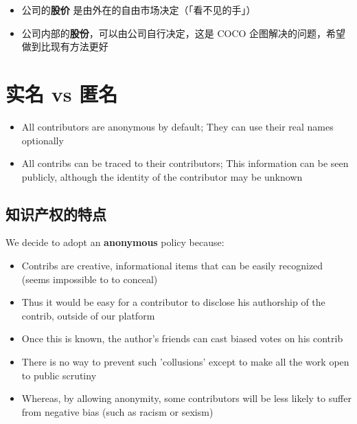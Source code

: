 \documentclass[12pt, orivec]{article}
\newcommand{\cc}[2]{#1}
\newcommand{\cc}[2]{#2}
\begin{document}
\begin{itemize}
	\item \cc{公司的\textbf{股价} 是由外在的自由市场决定（「看不见的手」）}
	{A company's \textbf{stock prices} are determined externally by the free-market (``invisible hand'')}

	\item \cc{公司内部的\textbf{股份}，可以由公司自行决定，这是 COCO 企图解决的问题，希望做到比现有方法更好}
	{How the company distributes its \textbf{shares} are decided internally;  This is where COCO tries to innovate}
\end{itemize}

\secttoc
\section{\cc{实名 vs 匿名}{Real-name vs anonymous}}

\begin{itemize}
	\item All contributors are anonymous by default;  They can use their real names optionally
	
	\item All contribs can be traced to their contributors;  This information can be seen publicly, although the identity of the contributor may be unknown
\end{itemize}

\secttoc
\subsection{\cc{知识产权的特点}{Uniqueness of intellectual properties}}

We decide to adopt an \textbf{anonymous} policy because:
\begin{itemize}
	\item Contribs are creative, informational items that can be easily recognized (seems impossible to to conceal)
	\item Thus it would be easy for a contributor to disclose his authorship of the contrib, outside of our platform
	\item Once this is known, the author's friends can cast biased votes on his contrib
	\item There is no way to prevent such 'collusions' except to make all the work open to public scrutiny
	\item Whereas, by allowing anonymity, some contributors will be less likely to suffer from negative bias (such as racism or sexism)
\end{itemize}
\end{document}
